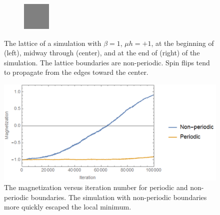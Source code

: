 \documentclass[]{article}
\begin{document}
\begin{figure}[htb]
\begin{subfigure}[b]{.3\textwidth}
	\end{subfigure}
	\begin{subfigure}[b]{.3\textwidth}
		\includegraphics[width=\textwidth]{figures/lattice1_3.png}
	\end{subfigure}
	\caption{The lattice of a simulation with $\beta = 1$, $\mu h = +1$, at the beginning of (left), midway through (center), and at the end of (right) of the simulation. The lattice boundaries are non-periodic. Spin flips tend to propagate from the edges toward the center.}
	\label{fig:nucleation}
\end{figure}

\begin{figure}[htb]
	\centering
	\includegraphics[width=\textwidth]{figures/m_v_t_per.png}
	\caption{The magnetization versus iteration number for periodic and non-periodic boundaries. The simulation with non-periodic boundaries more quickly escaped the local minimum.}
	\label{fig:conv_per}
\end{figure}
\end{document}
